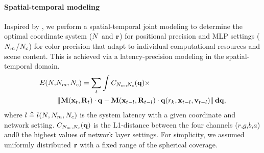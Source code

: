 \paragraph{Spatial-temporal modeling}
Inspired by \cite{Li:2020:TSP,albert2017latency}, we perform a spatial-temporal joint modeling to determine the optimal coordinate system ($N$ and $\mathbf{r}$) for positional precision and MLP settings ($N_{m}$/$N_{c}$) for color precision that adapt to individual computational resources and scene content. This is achieved via a latency-precision modeling in the spatial-temporal domain.
\begin{equation}
\begin{aligned}
E(N, &N_{m}, N_{c}) = 
\sum_t\int C_{N_{m}, N_{c}}(\mathbf{q})\times\\ &\left\lVert\mathbf{M}(\mathbf{x}_t,\mathbf{R}_t)\cdot\mathbf{q}-\mathbf{M}(\mathbf{x}_{t-l},\mathbf{R}_{t-l})\cdot\mathbf{q}(r_k,\mathbf{x}_{t-l},\mathbf{v}_{t-l})\right\rVert\mathbf{d}\mathbf{q},
\label{eq:error:image}
\end{aligned}
\end{equation}
where $l\triangleq l(N, N_{m}, N_{c})$ is the system latency with a given coordinate and network setting.
$C_{N_{m}, N_{c}}(\mathbf{q})$ is the L1-distance between the four channels ($r$,$g$,$b$,$a$) and0 the highest values of network layer settings. For simplicity, we assumed uniformly distributed $\mathbf{r}$ with a fixed range of the spherical coverage.

